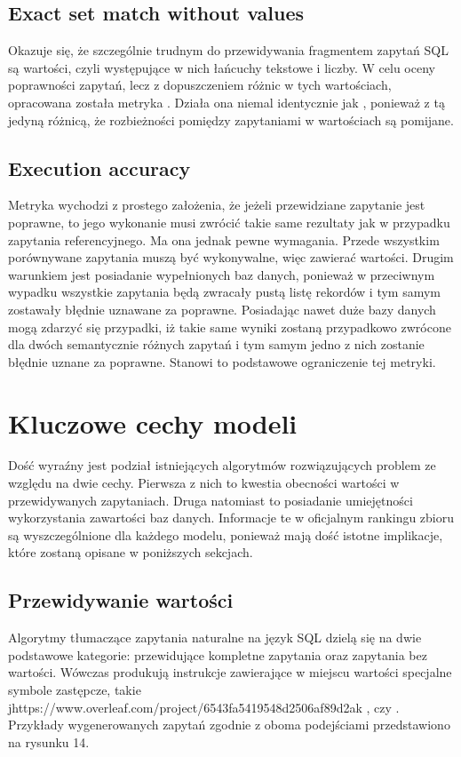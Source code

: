 \subsection{Exact set match without values}
Okazuje się, że szczególnie trudnym do przewidywania fragmentem zapytań SQL są wartości, czyli występujące w nich łańcuchy tekstowe i liczby. W celu oceny poprawności zapytań, lecz z dopuszczeniem różnic w tych wartościach, opracowana została metryka . Działa ona niemal identycznie jak , ponieważ z tą jedyną różnicą, że rozbieżności pomiędzy zapytaniami w wartościach są pomijane.

\subsection{Execution accuracy}
Metryka  wychodzi z prostego założenia, że jeżeli przewidziane zapytanie jest poprawne, to jego wykonanie musi zwrócić takie same rezultaty jak w przypadku zapytania referencyjnego. Ma ona jednak pewne wymagania. Przede wszystkim porównywane zapytania muszą być wykonywalne, więc zawierać wartości. Drugim warunkiem jest posiadanie wypełnionych baz danych, ponieważ w przeciwnym wypadku wszystkie zapytania będą zwracały pustą listę rekordów i tym samym zostawały błędnie uznawane za poprawne. Posiadając nawet duże bazy danych mogą zdarzyć się przypadki, iż takie same wyniki zostaną przypadkowo zwrócone dla dwóch semantycznie różnych zapytań i tym samym jedno z nich zostanie błędnie uznane za poprawne. Stanowi to podstawowe ograniczenie tej metryki.

\section{Kluczowe cechy modeli}
Dość wyraźny jest podział istniejących algorytmów rozwiązujących problem  ze względu na dwie cechy. Pierwsza z nich to kwestia obecności wartości w przewidywanych zapytaniach. Druga natomiast to posiadanie umiejętności wykorzystania zawartości baz danych. Informacje te w oficjalnym rankingu zbioru  są wyszczególnione dla każdego modelu, ponieważ mają dość istotne implikacje, które zostaną opisane w poniższych sekcjach.

\subsection{Przewidywanie wartości}
Algorytmy tłumaczące zapytania naturalne na język SQL dzielą się na dwie podstawowe kategorie: przewidujące kompletne zapytania oraz zapytania bez wartości. Wówczas produkują instrukcje zawierające w miejscu wartości specjalne symbole zastępcze, takie jhttps://www.overleaf.com/project/6543fa5419548d2506af89d2ak , czy . Przykłady wygenerowanych zapytań zgodnie z oboma podejściami przedstawiono na rysunku 14.

